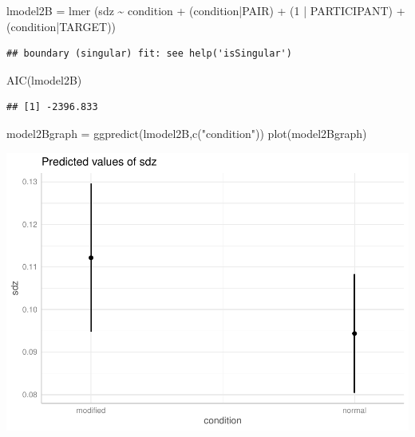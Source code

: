 \documentclass[
]{article}
\newenvironment{Shaded}{\begin{snugshade}}{\end{snugshade}}
\newcommand{\DecValTok}[1]{\textcolor[rgb]{0.00,0.00,0.81}{#1}}
\newcommand{\FunctionTok}[1]{\textcolor[rgb]{0.00,0.00,0.00}{#1}}
\newcommand{\NormalTok}[1]{#1}
\newcommand{\OtherTok}[1]{\textcolor[rgb]{0.56,0.35,0.01}{#1}}
\newcommand{\SpecialCharTok}[1]{\textcolor[rgb]{0.00,0.00,0.00}{#1}}
\newcommand{\StringTok}[1]{\textcolor[rgb]{0.31,0.60,0.02}{#1}}
\begin{document}
\begin{Shaded}
\begin{Highlighting}[]
\NormalTok{lmodel2B }\OtherTok{=}  \FunctionTok{lmer}\NormalTok{ (sdz }\SpecialCharTok{\textasciitilde{}}\NormalTok{   condition }\SpecialCharTok{+}\NormalTok{ (condition}\SpecialCharTok{|}\NormalTok{PAIR) }\SpecialCharTok{+}\NormalTok{ (}\DecValTok{1} \SpecialCharTok{|}\NormalTok{ PARTICIPANT) }\SpecialCharTok{+}\NormalTok{ (condition}\SpecialCharTok{|}\NormalTok{TARGET))}
\end{Highlighting}
\end{Shaded}

\begin{verbatim}
## boundary (singular) fit: see help('isSingular')
\end{verbatim}

\begin{Shaded}
\begin{Highlighting}[]
\FunctionTok{AIC}\NormalTok{(lmodel2B)}
\end{Highlighting}
\end{Shaded}

\begin{verbatim}
## [1] -2396.833
\end{verbatim}

\begin{Shaded}
\begin{Highlighting}[]
\NormalTok{model2Bgraph }\OtherTok{=} \FunctionTok{ggpredict}\NormalTok{(lmodel2B,}\FunctionTok{c}\NormalTok{(}\StringTok{"condition"}\NormalTok{))}
\FunctionTok{plot}\NormalTok{(model2Bgraph)}
\end{Highlighting}
\end{Shaded}

\includegraphics{Report_files/figure-latex/pressure-1.pdf}
\end{document}
